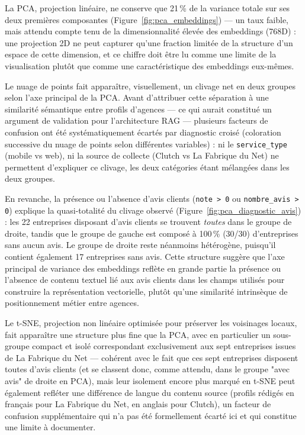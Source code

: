 La PCA, projection linéaire, ne conserve que 21\,\% de la variance totale sur ses deux premières
composantes (Figure~\ref{fig:pca_embeddings}) --- un taux faible, mais attendu compte tenu de la
dimensionnalité élevée des embeddings (768D) : une projection 2D ne peut capturer qu'une fraction limitée
de la structure d'un espace de cette dimension, et ce chiffre doit être lu comme une limite de la
visualisation plutôt que comme une caractéristique des embeddings eux-mêmes.

Le nuage de points fait apparaître, visuellement, un clivage net en deux groupes selon l'axe principal de
la PCA. Avant d'attribuer cette séparation à une similarité sémantique entre profils d'agences --- ce qui
aurait constitué un argument de validation pour l'architecture RAG --- plusieurs facteurs de confusion ont
été systématiquement écartés par diagnostic croisé (coloration successive du nuage de points selon
différentes variables) : ni le \texttt{service\_type} (mobile vs web), ni la source de collecte (Clutch vs
La Fabrique du Net) ne permettent d'expliquer ce clivage, les deux catégories étant mélangées dans les
deux groupes.

En revanche, la présence ou l'absence d'avis clients (\texttt{note > 0} ou \texttt{nombre\_avis > 0})
explique la quasi-totalité du clivage observé (Figure~\ref{fig:pca_diagnostic_avis}) : les 22 entreprises
disposant d'avis clients se trouvent \emph{toutes} dans le groupe de droite, tandis que le groupe de
gauche est composé à 100\,\% (30/30) d'entreprises sans aucun avis. Le groupe de droite reste néanmoins
hétérogène, puisqu'il contient également 17 entreprises sans avis. Cette structure suggère que l'axe
principal de variance des embeddings reflète en grande partie la présence ou l'absence de contenu textuel
lié aux avis clients dans les champs utilisés pour construire la représentation vectorielle, plutôt qu'une
similarité intrinsèque de positionnement métier entre agences.

Le t-SNE, projection non linéaire optimisée pour préserver les voisinages locaux, fait apparaître une
structure plus fine que la PCA, avec en particulier un sous-groupe compact et isolé correspondant
exclusivement aux sept entreprises issues de La Fabrique du Net --- cohérent avec le fait que ces sept
entreprises disposent toutes d'avis clients (et se classent donc, comme attendu, dans le groupe "avec
avis" de droite en PCA), mais leur isolement encore plus marqué en t-SNE peut également refléter une
différence de langue du contenu source (profils rédigés en français pour La Fabrique du Net, en anglais
pour Clutch), un facteur de confusion supplémentaire qui n'a pas été formellement écarté ici et qui
constitue une limite à documenter.

